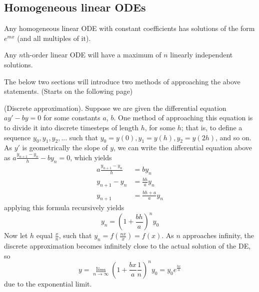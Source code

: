 \documentclass{article}
\begin{document}
\subsection{Homogeneous linear ODEs}
\begin{theorem}
    Any homogeneous linear ODE with constant coefficients has solutions of the form $e^{mx}$ (and all multiples of it). 
\end{theorem}
\begin{theorem}
    Any $n$th-order linear ODE will have a maximum of $n$ linearly independent solutions.
\end{theorem}
The below two sections will introduce two methods of approaching the above statements. (Starts on the following page)
\begin{method}
(Discrete approximation). Suppose we are given the differential equation $ay' - by = 0$ for some constants $a$, $b$. One method of approaching this equation 
is to divide it into discrete timesteps of length $h$, for some $h$; that is, to define a sequence $y_0, y_1, y_2, ...$ such that $y_0 = y(0), y_1=y(h), y_2=y(2h)$, and so on. As $y'$ is geometrically the slope of $y$, 
we can write the differential equation above as $a\frac{y_{n+1}-y_n}{h} - by_n = 0$, which yields
\begin{equation*}
    \begin{aligned}
        a\frac{y_{n+1}-y_n}{h}&=by_n \\
        y_{n+1}-y_n &= \frac{bh}{a}y_n \\
        y_{n+1} &= \frac{bh + a}{a}y_n 
    \end{aligned}
\end{equation*}
applying this formula recursively yields
\begin{equation*}
    y_n = (1 + \frac{bh}{a})^n y_0
\end{equation*}
Now let $h$ equal $\frac{x}{n}$, such that $y_n = f(\frac{nx}{x}) = f(x)$. As $n$ approaches infinity, the discrete approximation becomes infinitely close to the actual solution of the DE, so
\begin{equation*}
    y = \lim_{n\to \infty} (1+\frac{bx}{a}\frac{1}{n})^n y_0 = y_0 e^{\frac{bx}{a}}
\end{equation*}
due to the exponential limit.
\end{method}
\end{document}
